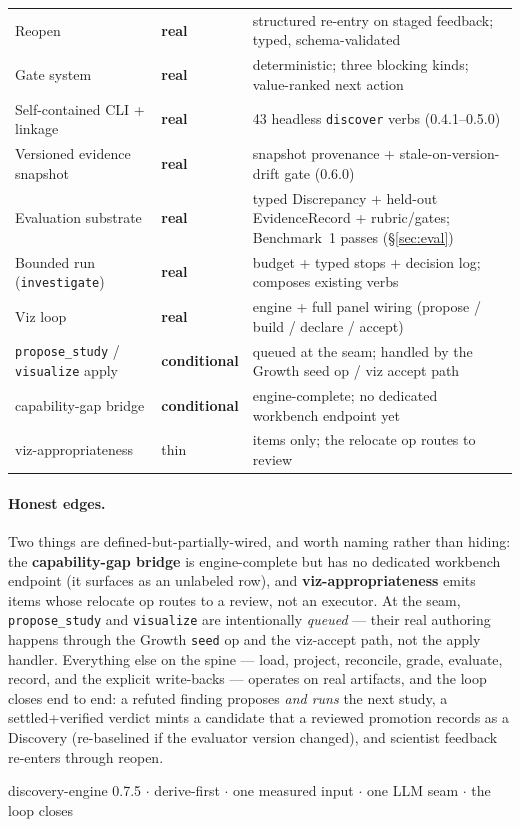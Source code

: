 \documentclass[11pt]{article}
\newcommand{\code}[1]{\texttt{\small #1}}
\newcommand{\real}{\textcolor{good}{\textbf{real}}}
\newcommand{\cond}{\textcolor{warn}{\textbf{conditional}}}
\begin{document}
\begin{center}
\begin{tabularx}{\textwidth}{@{}l l Y@{}}
Reopen & \real & structured re-entry on staged feedback; typed, schema-validated\\
Gate system & \real & deterministic; three blocking kinds; value-ranked next action\\
Self-contained CLI + linkage & \real & 43 headless \code{discover} verbs (0.4.1--0.5.0)\\
Versioned evidence snapshot & \real & snapshot provenance + stale-on-version-drift gate (0.6.0)\\
Evaluation substrate & \real & typed Discrepancy + held-out EvidenceRecord + rubric/gates; Benchmark~1 passes (\S\ref{sec:eval})\\
Bounded run (\code{investigate}) & \real & budget + typed stops + decision log; composes existing verbs\\
Viz loop & \real & engine + full panel wiring (propose / build / declare / accept)\\
\code{propose\_study} / \code{visualize} apply & \cond & queued at the seam; handled by the Growth seed op / viz accept path\\
capability-gap bridge & \cond & engine-complete; no dedicated workbench endpoint yet\\
viz-appropriateness & thin & items only; the relocate op routes to review\\
\bottomrule
\end{tabularx}
\end{center}

\paragraph{Honest edges.} Two things are defined-but-partially-wired, and worth naming rather than
hiding: the \textbf{capability-gap bridge} is engine-complete but has no dedicated workbench
endpoint (it surfaces as an unlabeled row), and \textbf{viz-appropriateness} emits items whose
relocate op routes to a review, not an executor. At the seam, \code{propose\_study} and
\code{visualize} are intentionally \emph{queued} --- their real authoring happens through the
Growth \code{seed} op and the viz-accept path, not the apply handler. Everything else on the spine
--- load, project, reconcile, grade, evaluate, record, and the explicit write-backs --- operates on
real artifacts, and the loop closes end to end: a refuted finding proposes \emph{and runs} the next
study, a settled+verified verdict mints a candidate that a reviewed promotion records as a
Discovery (re-baselined if the evaluator version changed), and scientist feedback re-enters through
reopen.

\vfill
\begin{center}\footnotesize\color{muted}
discovery-engine 0.7.5 \;$\cdot$\; derive-first \;$\cdot$\; one measured input \;$\cdot$\; one LLM seam \;$\cdot$\; the loop closes
\end{center}
\end{document}
